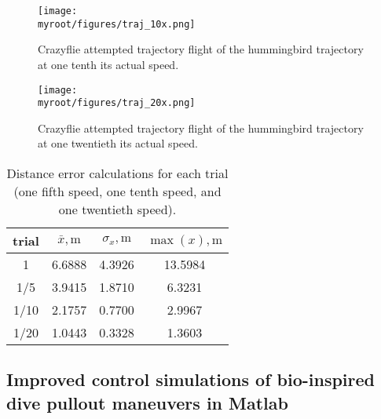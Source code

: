 \documentclass[onecolumn,10pt]{IEEEtran}
\newcommand{\myroot}{../}
\newcommand{\Matlab}{Matlab}
\begin{document}
\begin{figure}[p]
\begin{center}
\texttt{[image: \\myroot/figures/traj\_10x.png]}
\end{center}
\caption{Crazyflie attempted trajectory flight of the hummingbird trajectory at one tenth its actual speed.}
\label{fig:onetenthspeed}
\end{figure}

\begin{figure}[p]
\begin{center}
\texttt{[image: \\myroot/figures/traj\_20x.png]}
\end{center}
\caption{Crazyflie attempted trajectory flight of the hummingbird trajectory at one twentieth its actual speed.}
\label{fig:onetwentiethspeed}
\end{figure}

\begin{table}[hb]
\caption{Distance error calculations for each trial (one fifth speed, one tenth speed, and one twentieth speed).}
\label{tab:RMSE}
\begin{center}
\begin{tabular}{cccc}
\toprule
trial & $\bar{x}, \si{\meter}$ & $\sigma_x, \si{\meter}$ & $\max(x), \si{\meter}$  \\ %
\midrule
1 & 6.6888 & 4.3926 & 13.5984 \\
1/5 & 3.9415 & 1.8710 & 6.3231 \\
1/10 & 2.1757 & 0.7700 & 2.9967 \\
1/20 & 1.0443 & 0.3328 & 1.3603 \\
\bottomrule
\end{tabular}
\end{center}
\end{table}

\subsection{Improved control simulations of bio-inspired dive pullout maneuvers in \Matlab}

\end{document}

